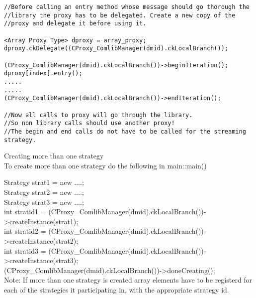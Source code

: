 \begin{enumerate}
\begin{verbatim}
//Before calling an entry method whose message should go thorough the
//library the proxy has to be delegated. Create a new copy of the
//proxy and delegate it before using it.

<Array Proxy Type> dproxy = array_proxy;
dproxy.ckDelegate((CProxy_ComlibManager(dmid).ckLocalBranch());

(CProxy_ComlibManager(dmid).ckLocalBranch())->beginIteration();
dproxy[index].entry();
.....
.....
(CProxy_ComlibManager(dmid).ckLocalBranch())->endIteration();

//Now all calls to proxy will go through the library.
//So non library calls should use another proxy!
//The begin and end calls do not have to be called for the streaming strategy.
\end{verbatim}
\end{enumerate}

Creating more than one strategy \\
To create more than one strategy do the following in main::main()

Strategy strat1 = new ....; \\
Strategy strat2 = new ....; \\
Strategy strat3 = new ....; \\

int stratid1 = (CProxy\_ComlibManager(dmid).ckLocalBranch())->createInstance(strat1); \\
int stratid2 = (CProxy\_ComlibManager(dmid).ckLocalBranch())->createInstance(strat2); \\
int stratid3 = (CProxy\_ComlibManager(dmid).ckLocalBranch())->createInstance(strat3); \\

(CProxy\_ComlibManager(dmid).ckLocalBranch())->doneCreating(); \\

Note: If more than one strategy is created array elements have to be
registerd for each of the strategies it participating in, with the
appropriate strategy id.
